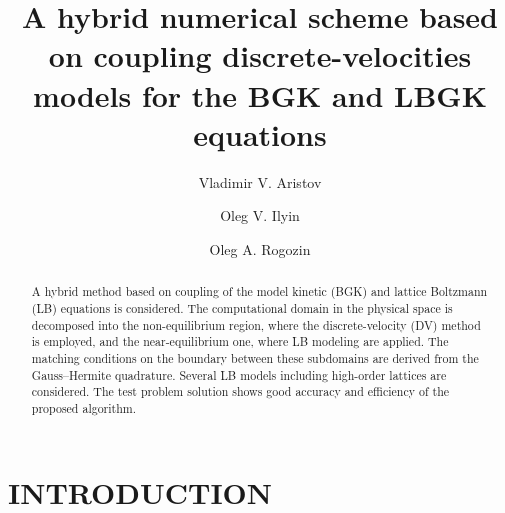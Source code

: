 \documentclass{aip-cp}
\begin{document}
\title{A hybrid numerical scheme based on coupling discrete-velocities models for the BGK and LBGK equations}

\author[aff2]{Vladimir V. Aristov}
\author[aff2]{Oleg V. Ilyin}
\author[aff1,aff2]{Oleg A. Rogozin}




\maketitle


\begin{abstract}
A hybrid method based on coupling of the model kinetic (BGK) and lattice Boltzmann (LB) equations is considered.
The computational domain in the physical space is decomposed
into the non-equilibrium region, where the discrete-velocity (DV) method is employed,
and the near-equilibrium one, where LB modeling are applied.
The matching conditions on the boundary between these subdomains are derived from the Gauss--Hermite quadrature.
Several LB models including high-order lattices are considered.
The test problem solution shows good accuracy and efficiency of the proposed algorithm.
\end{abstract}

\section{INTRODUCTION}\label{sec:intro}
\end{document}
